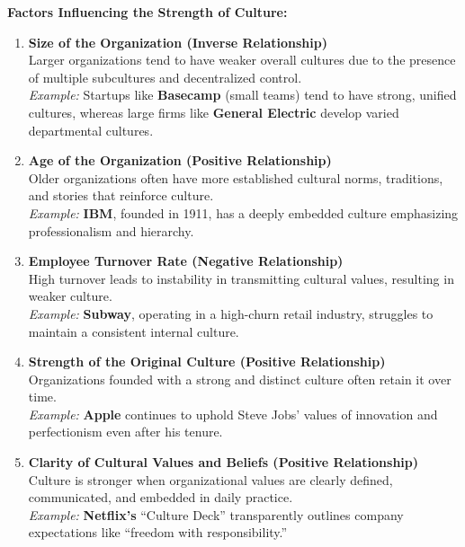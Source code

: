 \documentclass[10pt,a4paper]{book}
\begin{document}
\vspace{1cm}

\begin{multicols}{2}
\textbf{Factors Influencing the Strength of Culture:}

\begin{enumerate}
    \item \textbf{Size of the Organization (Inverse Relationship)} \\
    Larger organizations tend to have weaker overall cultures due to the presence of multiple subcultures and decentralized control.\\
    \textit{Example:} Startups like \textbf{Basecamp} (small teams) tend to have strong, unified cultures, whereas large firms like \textbf{General Electric} develop varied departmental cultures.

    \item \textbf{Age of the Organization (Positive Relationship)} \\
    Older organizations often have more established cultural norms, traditions, and stories that reinforce culture.\\
    \textit{Example:} \textbf{IBM}, founded in 1911, has a deeply embedded culture emphasizing professionalism and hierarchy.

    \item \textbf{Employee Turnover Rate (Negative Relationship)} \\
    High turnover leads to instability in transmitting cultural values, resulting in weaker culture.\\
    \textit{Example:} \textbf{Subway}, operating in a high-churn retail industry, struggles to maintain a consistent internal culture.

    \item \textbf{Strength of the Original Culture (Positive Relationship)} \\
    Organizations founded with a strong and distinct culture often retain it over time.\\
    \textit{Example:} \textbf{Apple} continues to uphold Steve Jobs’ values of innovation and perfectionism even after his tenure.

    \item \textbf{Clarity of Cultural Values and Beliefs (Positive Relationship)} \\
    Culture is stronger when organizational values are clearly defined, communicated, and embedded in daily practice.\\
    \textit{Example:} \textbf{Netflix’s} “Culture Deck” transparently outlines company expectations like “freedom with responsibility.”


\end{enumerate}
\end{multicols}
\end{document}
